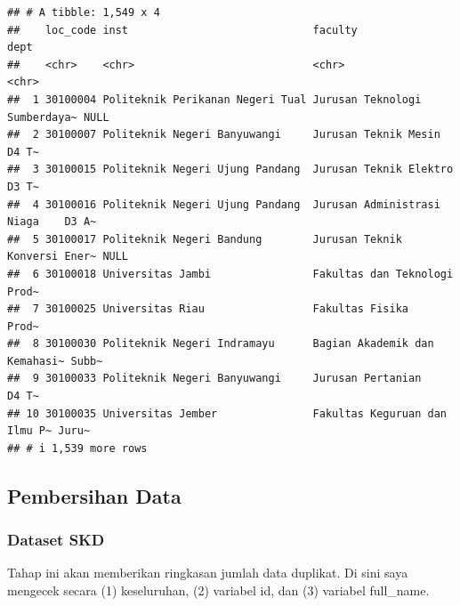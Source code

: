 \documentclass[
]{article}
\newenvironment{Shaded}{\begin{snugshade}}{\end{snugshade}}
\newcommand{\FunctionTok}[1]{\textcolor[rgb]{0.13,0.29,0.53}{\textbf{#1}}}
\newcommand{\NormalTok}[1]{#1}
\newcommand{\OtherTok}[1]{\textcolor[rgb]{0.56,0.35,0.01}{#1}}
\newcommand{\SpecialCharTok}[1]{\textcolor[rgb]{0.81,0.36,0.00}{\textbf{#1}}}
\begin{document}
\begin{verbatim}
## # A tibble: 1,549 x 4
##    loc_code inst                             faculty                       dept 
##    <chr>    <chr>                            <chr>                         <chr>
##  1 30100004 Politeknik Perikanan Negeri Tual Jurusan Teknologi Sumberdaya~ NULL 
##  2 30100007 Politeknik Negeri Banyuwangi     Jurusan Teknik Mesin          D4 T~
##  3 30100015 Politeknik Negeri Ujung Pandang  Jurusan Teknik Elektro        D3 T~
##  4 30100016 Politeknik Negeri Ujung Pandang  Jurusan Administrasi Niaga    D3 A~
##  5 30100017 Politeknik Negeri Bandung        Jurusan Teknik Konversi Ener~ NULL 
##  6 30100018 Universitas Jambi                Fakultas dan Teknologi        Prod~
##  7 30100025 Universitas Riau                 Fakultas Fisika               Prod~
##  8 30100030 Politeknik Negeri Indramayu      Bagian Akademik dan Kemahasi~ Subb~
##  9 30100033 Politeknik Negeri Banyuwangi     Jurusan Pertanian             D4 T~
## 10 30100035 Universitas Jember               Fakultas Keguruan dan Ilmu P~ Juru~
## # i 1,539 more rows
\end{verbatim}

\subsection{Pembersihan Data}\label{pembersihan-data}

\subsubsection{Dataset SKD}\label{dataset-skd}

Tahap ini akan memberikan ringkasan jumlah data duplikat. Di sini saya
mengecek secara (1) keseluruhan, (2) variabel id, dan (3) variabel
full\_name.

\begin{Shaded}
\end{Shaded}
\end{document}
